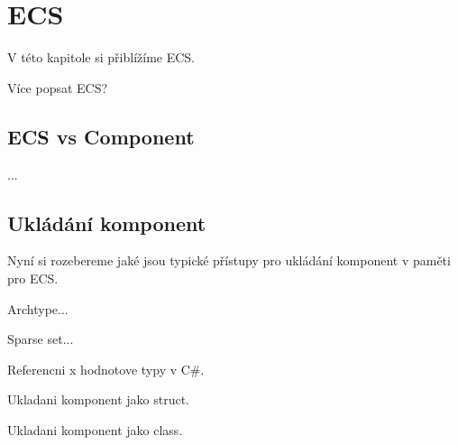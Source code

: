 \chapter{ECS}
\label{chap:ecs}
V této kapitole si přiblížíme ECS.

Více popsat ECS?

\section{ECS vs Component}
...

\section{Ukládání komponent}
Nyní si rozebereme jaké jsou typické přístupy pro ukládání komponent v paměti pro ECS.

Archtype...

Sparse set...

Referencni x hodnotove typy v C\#.

Ukladani komponent jako struct.

Ukladani komponent jako class.




